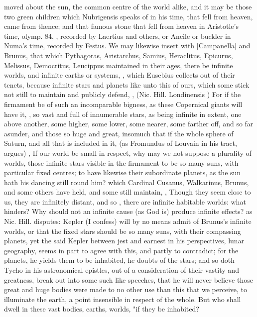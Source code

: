 {moved about the sun, the common centre of the world alike, and it may be those two green children which Nubrigensis speaks of in his time, that fell from heaven, came from thence; and that famous stone that fell from heaven in Aristotle's time, olymp. 84, , recorded by Laertius and others, or Ancile or buckler in Numa's time, recorded by Festus. We may likewise insert with [Campanella] and Brunus, that which Pythagoras, Aristarchus, Samius, Heraclitus, Epicurus, Melissus, Democritus, Leucippus maintained in their ages, there be infinite worlds, and infinite earths or systems, , which Eusebius collects out of their tenets, because infinite stars and planets like unto this of ours, which some stick not still to maintain and publicly defend, , \etc{} (Nic. Hill. Londinensis ) For if the firmament be of such an incomparable bigness, as these Copernical giants will have it, , so vast and full of innumerable stars, as being infinite in extent, one above another, some higher, some lower, some nearer, some farther off, and so far asunder, and those so huge and great, insomuch that if the whole sphere of Saturn, and all that is included in it,  (as Fromundus of Louvain in his tract,  argues) , \etc{} If our world be small in respect, why may we not suppose a plurality of worlds, those infinite stars visible in the firmament to be so many suns, with particular fixed centres; to have likewise their subordinate planets, as the sun hath his dancing still round him? which Cardinal Cusanus, Walkarinus, Brunus, and some others have held, and some still maintain, , \etc{} Though they seem close to us, they are infinitely distant, and so , there are infinite habitable worlds: what hinders? Why should not an infinite cause (as God is) produce infinite effects? as Nic. Hill.  disputes: Kepler (I confess) will by no means admit of Brunus's infinite worlds, or that the fixed stars should be so many suns, with their compassing planets, yet the said Kepler between jest and earnest in his perspectives, lunar geography,   seems in part to agree with this, and partly to contradict; for the planets, he yields them to be inhabited, he doubts of the stars; and so doth Tycho in his astronomical epistles, out of a consideration of their vastity and greatness, break out into some such like speeches, that he will never believe those great and huge bodies were made to no other use than this that we perceive, to illuminate the earth, a point insensible in respect of the whole. But who shall dwell in these vast bodies, earths, worlds, "if they be inhabited? }
